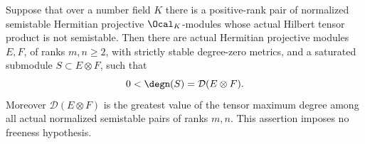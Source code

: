 \begin{lemma}
\label{lem:strict-maximizing-counterexample}
\leanok
Suppose that over a number field $K$ there is a positive-rank pair
of normalized semistable Hermitian projective $\Ocal_K$-modules
whose actual Hilbert tensor product is not semistable. Then there
are actual Hermitian projective modules $E,F$, of ranks $m,n\geq2$,
with strictly stable degree-zero metrics, and a saturated submodule
$S\subset E\otimes F$, such that
\[
 0<\degn(S)=\mathcal D(E\otimes F).
\]
Moreover $\mathcal D(E\otimes F)$ is the greatest value of the
tensor maximum degree among all actual normalized semistable pairs
of ranks $m,n$. This assertion imposes no freeness hypothesis.
\end{lemma}

